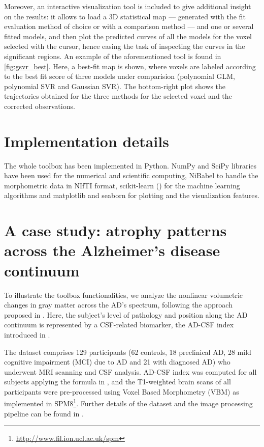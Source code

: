 \documentclass{article}
\begin{document}
Moreover, an interactive visualization tool is included to give additional insight on the results: it allows to load a 3D statistical map — generated with the fit evaluation method of choice or with a comparison method — and one or several fitted models, and then plot the predicted curves of all the models for the voxel selected with the cursor, hence easing the task of inspecting the curves in the significant regions. An example of the aforementioned tool is found in \autoref{fig:gsvr_best}. Here, a best-fit map is shown, where voxels are labeled according to the best fit score of three models under comparision (polynomial GLM, polynomial SVR and Gaussian SVR). The bottom-right plot shows the trajectories obtained for the three methods for the selected voxel and the corrected observations.


\section{Implementation details}

The whole toolbox has been implemented in Python. NumPy and SciPy libraries have been used for the numerical and scientific computing, NiBabel to handle the morphometric data in NIfTI format, scikit-learn (\cite{scikit-learn}) for the machine learning algorithms and matplotlib and seaborn for plotting and the visualization features.


\section{A case study: atrophy patterns across the Alzheimer's disease continuum}

To illustrate the toolbox functionalities, we analyze the nonlinear volumetric changes in gray matter across the AD's spectrum, following the approach proposed in \cite{Nonlinear_Gispert_2015}. Here, the subject's level of pathology and position along the AD continuum is represented by a CSF-related biomarker, the AD-CSF index introduced in \cite{ADCSF_Molinuevo_2013}. 

The dataset comprises 129 participants (62 controls, 18 preclinical AD, 28 mild cognitive impairment (MCI) due to AD and 21 with diagnosed AD) who underwent MRI scanning and CSF analysis. AD-CSF index was computed for all subjects applying the formula in \cite{ADCSF_Molinuevo_2013}, and the T1-weighted brain scans of all participants were pre-processed using Voxel Based Morphometry (VBM) as implemented in SPM8\footnote{\url{http://www.fil.ion.ucl.ac.uk/spm}}. Further details of the 
dataset and the image processing pipeline can be found in \cite{Nonlinear_Gispert_2015}.
\end{document}

